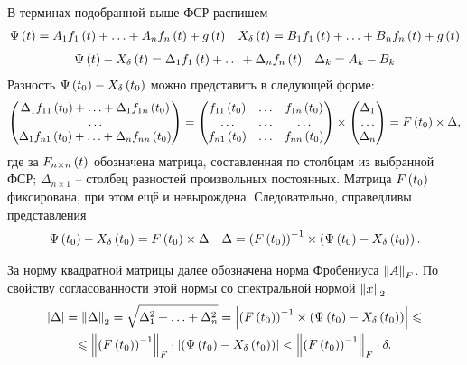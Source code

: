 \documentclass[a5paper,10pt]{article}
\begin{document}
В терминах подобранной выше ФСР распишем
\begin{align*}
\Psi\left(t\right) = A_{1} f_{1}\left(t\right) + \ldots + A_{n} f_{n}\left(t\right) + g\left(t\right) 
&& X_{\delta}\left(t\right) = B_{1} f_{1}\left(t\right) + \ldots + B_{n} f_{n}\left(t\right) + g\left(t\right)
\end{align*}
\begin{align*}
\Psi\left(t\right) - X_{\delta}\left(t\right) = \Delta_{1} f_{1}\left(t\right) + \ldots + \Delta_{n} f_{n}\left(t\right) 
&& \Delta_{k} = A_{k} - B_{k}
\end{align*}
Разность $\Psi\left(t_{0}\right) - X_{\delta}\left(t_{0}\right)$ можно представить в следующей форме:
$$
\begin{pmatrix}
\Delta_{1} f_{11}\left(t_{0}\right) + \ldots + \Delta_{1} f_{1n}\left(t_{0}\right) \\
\ldots \\
\Delta_{1} f_{n1}\left(t_{0}\right) + \ldots + \Delta_{n} f_{nn}\left(t_{0}\right) 
\end{pmatrix}
= 
\begin{pmatrix}
f_{11}\left(t_{0}\right) & \ldots & f_{1n}\left(t_{0}\right) \\
\ldots & \ldots & \ldots \\
f_{n1}\left(t_{0}\right) & \ldots & f_{nn}\left(t_{0}\right) \\
\end{pmatrix}
\times
\begin{pmatrix}
\Delta_{1} \\ \ldots \\ \Delta_{n}
\end{pmatrix}
= F\left(t_{0}\right) \times \Delta,
$$
где за $F_{n \times n}\left(t\right)$ обозначена матрица, составленная по столбцам из выбранной ФСР; $\Delta_{n \times 1}$ -- столбец разностей произвольных постоянных.  Матрица $F\left(t_{0}\right)$ фиксирована, при этом ещё и невырождена. Следовательно, справедливы представления
\begin{align*}
\Psi\left(t_{0}\right) - X_{\delta}\left(t_{0}\right) = F\left(t_{0}\right) \times \Delta 
&& \Delta = \left(F\left(t_{0}\right)\right)^{-1} \times \left(\Psi\left(t_{0}\right) - X_{\delta}\left(t_{0}\right)\right).
\end{align*}

За норму квадратной матрицы далее обозначена норма Фробениуса $\left\lVert A\right\rVert_{F}$. По свойству согласованности этой нормы со спектральной нормой $\left\lVert x\right\rVert_{2}$
\begin{multline*}
\left|\Delta\right| = \left\lVert\Delta\right\rVert_{2}
= \sqrt{\Delta_{1}^2 + \ldots + \Delta_{n}^2}
= \left|\left(F\left(t_{0}\right)\right)^{-1} \times \left(\Psi\left(t_{0}\right) - X_{\delta}\left(t_{0}\right)\right)\right| \leqslant 
\\ \leqslant \left\lVert\left(F\left(t_{0}\right)\right)^{-1}\right\rVert_{F} \cdot \left|\left(\Psi\left(t_{0}\right) - X_{\delta}\left(t_{0}\right)\right)\right|
< \left\lVert\left(F\left(t_{0}\right)\right)^{-1}\right\rVert_{F} \cdot \delta.
\end{multline*}
\end{document}
